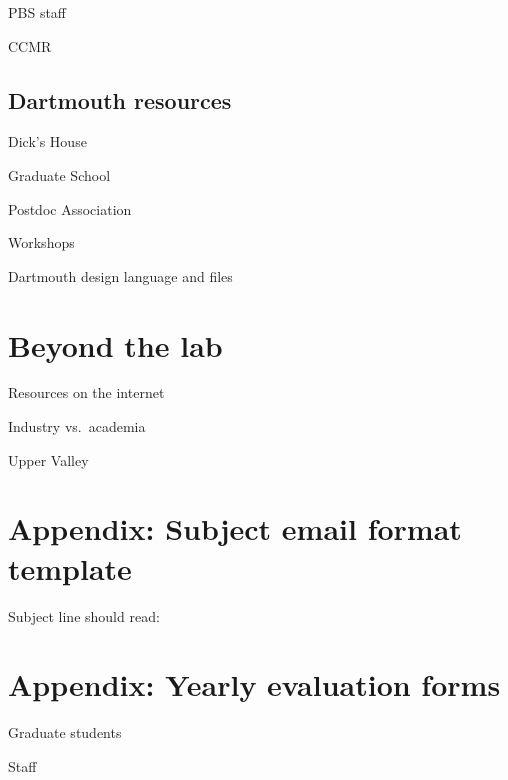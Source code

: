 \documentclass{tufte-book}
\begin{document}
PBS staff

CCMR 

\section{Dartmouth resources}

Dick's House

Graduate School

Postdoc Association

Workshops

Dartmouth design language and files

\chapter{Beyond the lab}

Resources on the internet

Industry vs.\ academia

Upper Valley



\chapter{Appendix: Subject email format template}

Subject line should read:

\chapter{Appendix: Yearly evaluation forms}

Graduate students

Staff

\backmatter





\printindex
\end{document}
